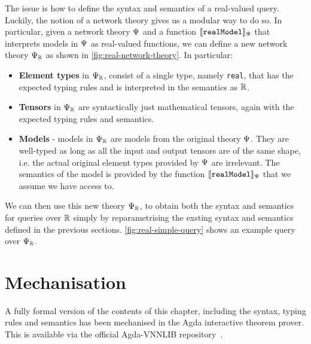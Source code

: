 The issue is how to define the syntax and semantics of a real-valued query.
Luckily, the notion of a network theory gives us a modular way to do so. In particular, given a network theory $\Psi$ and a function $\llbracket \mathtt{realModel} \rrbracket_\Psi$ that interprets models in $\Psi$ as real-valued functions, we can define a new network theory $\Psi_{\mathbb{R}}$ as shown in \autoref{fig:real-network-theory}. In particular:
\begin{itemize}
\item \textbf{Element types} in $\Psi_{\mathbb{R}}$, consist of a single type, namely \texttt{real}, that has the expected typing rules and is interpreted in the semantics as $\mathbb{R}$.
\item \textbf{Tensors} in $\Psi_{\mathbb{R}}$ are syntactically just mathematical tensors, again with the expected typing rules and semantics.
\item \textbf{Models} - models in $\Psi_{\mathbb{R}}$ are models from the original theory $\Psi$. They are well-typed as long as all the input and output tensors are of the same shape, i.e. the actual original element types provided by $\Psi$ are irrelevant. The semantics of the model is provided by the function $\llbracket \mathtt{realModel} \rrbracket_\Psi$ that we assume we have access to.
\end{itemize}
We can then use this new theory $\Psi_{\mathbb{R}}$, to obtain both the syntax and semantics for queries over $\mathbb{R}$ simply by reparametrising the exsting syntax and semantics defined in the previous sections. \autoref{fig:real-simple-query} shows an example query over $\Psi_{\mathbb{R}}$.

\section{Mechanisation}

A fully formal version of the contents of this chapter, including the syntax, typing rules and semantics has been mechanised in the Agda interactive theorem prover.
This is available via the official Agda-VNNLIB repository~\cite{}. 